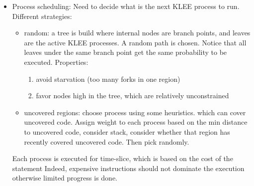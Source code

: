 \begin{itemize}

  \item Process scheduling: Need to decide what is the next KLEE process to run. Different strategies:
    \begin{itemize}
      \item random: a tree is build where internal nodes are branch points, and leaves are the active KLEE processes. A random path is chosen. Notice that all leaves under the same branch point get the same probability to be executed. Properties:
        \begin{enumerate}
          \item avoid starvation (too many forks in one region)
          \item favor nodes high in the tree, which are relatively unconstrained
        \end{enumerate}
      \item uncovered regions: choose process using some heuristics. which can cover uncovered code. Assign weight to each process based on the min distance to uncovered code, consider stack, consider whether that region has recently covered uncovered code. Then pick randomly.
    \end{itemize}
    Each process is executed for time-slice, which is based on the cost of the statement Indeed, expensive instructions should not dominate the execution otherwise limited progress is done.


\end{itemize}

